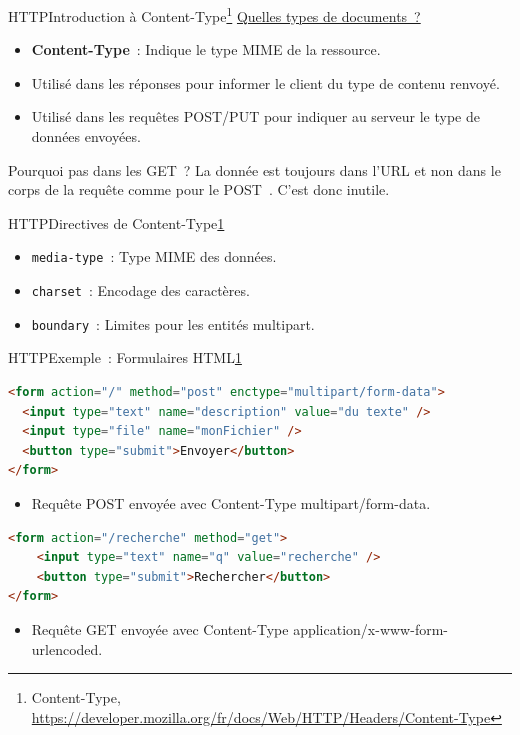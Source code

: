 \documentclass{beamer}
\begin{document}
    \begin{frame}{HTTP}{Introduction à Content-Type\footnote{\label{mozilla-content-type}Content-Type, \url{https://developer.mozilla.org/fr/docs/Web/HTTP/Headers/Content-Type}}}
        \href{https://app.wooclap.com/events/NUDMYH/questions/68d2fc6907003967e10f34dd}{Quelles types de documents~?}
        \pause
        \begin{itemize}
            \item \textbf{Content-Type}~: Indique le type MIME de la ressource.
            \item Utilisé dans les réponses pour informer le client du type de contenu renvoyé.
            \item Utilisé dans les requêtes POST/PUT pour indiquer au serveur le type de données envoyées.
        \end{itemize}
        \bigbreak
        Pourquoi pas dans les GET~?
        \pause
        La donnée est toujours dans l'URL et non dans le corps de la requête comme pour le POST~.
        C'est donc inutile.
    \end{frame}

    \begin{frame}{HTTP}{Directives de Content-Type\cref{mozilla-content-type}}
        \begin{itemize}
            \item \lstinline{media-type}~: Type MIME des données.
            \item \lstinline{charset}~: Encodage des caractères.
            \item \lstinline{boundary}~: Limites pour les entités multipart.
        \end{itemize}
    \end{frame}

    \begin{frame}[fragile]{HTTP}{Exemple~: Formulaires HTML\cref{mozilla-content-type}}
        \begin{lstlisting}[language=HTML]
<form action="/" method="post" enctype="multipart/form-data">
  <input type="text" name="description" value="du texte" />
  <input type="file" name="monFichier" />
  <button type="submit">Envoyer</button>
</form>
        \end{lstlisting}
        \begin{itemize}
            \item Requête POST envoyée avec Content-Type multipart/form-data.
        \end{itemize}
        \begin{lstlisting}[language=HTML]
<form action="/recherche" method="get">
    <input type="text" name="q" value="recherche" />
    <button type="submit">Rechercher</button>
</form>
        \end{lstlisting}
        \begin{itemize}
            \item Requête GET envoyée avec Content-Type application/x-www-form-urlencoded.
        \end{itemize}

    \end{frame}
\end{document}

